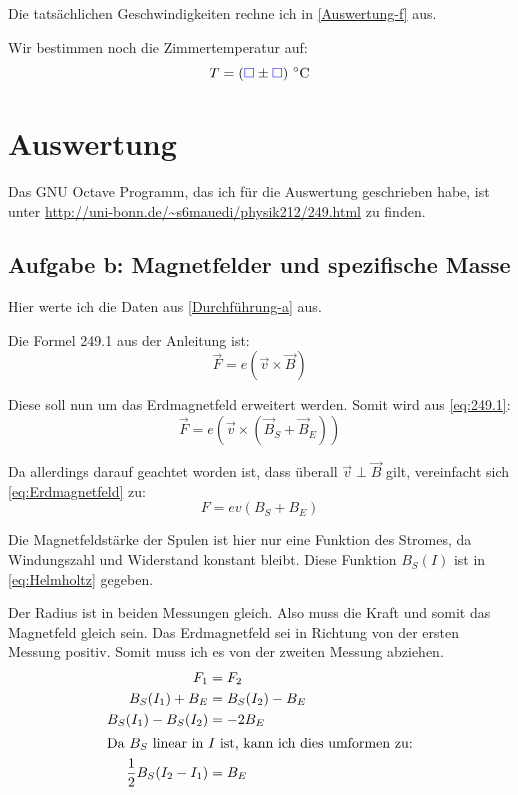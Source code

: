 \documentclass[11pt, ngerman]{article}
\newcommand{\emesswert}{\left(\messwert \pm \messwert \right)}
\newcommand{\half}{\frac{1}{2}}
\newcommand{\messwert}{\textcolor{blue}{\square}}
\begin{document}
Die tatsächlichen Geschwindigkeiten rechne ich in \ref{Auswertung-f} aus.

Wir bestimmen noch die Zimmertemperatur auf:
\[ T = \unit[\emesswert]{^\circ C} \]


\section{Auswertung}

Das GNU Octave Programm, das ich für die Auswertung geschrieben habe, ist unter
\url{http://uni-bonn.de/~s6mauedi/physik212/249.html} zu finden.

\subsection{Aufgabe b: Magnetfelder und spezifische Masse}

\label{Auswertung-b}

Hier werte ich die Daten aus \ref{Durchführung-a} aus.

Die Formel 249.1 aus der Anleitung ist:
\begin{equation}
	\label{eq:249.1}
	\vec F = e \left( \vec v \times \vec B \right)
\end{equation}

Diese soll nun um das Erdmagnetfeld erweitert werden. Somit wird aus
\eqref{eq:249.1}:
\begin{equation}
	\label{eq:Erdmagnetfeld}
	\vec F = e \left( \vec v \times \left( \vec B_S + \vec B_E \right) \right)
\end{equation}

Da allerdings darauf geachtet worden ist, dass überall $\vec v \perp \vec B$
gilt, vereinfacht sich \eqref{eq:Erdmagnetfeld} zu:
\begin{equation}
	\label{eq:magnetische-Kraft}
	F = e v (B_S + B_E)
\end{equation}

Die Magnetfeldstärke der Spulen ist hier nur eine Funktion des Stromes, da
Windungszahl und Widerstand konstant bleibt. Diese Funktion $B_S(I)$ ist in
\eqref{eq:Helmholtz} gegeben.

Der Radius ist in beiden Messungen gleich. Also muss die Kraft und somit das
Magnetfeld gleich sein. Das Erdmagnetfeld sei in Richtung von der ersten
Messung positiv. Somit muss ich es von der zweiten Messung abziehen.
%
\begin{align*}
	F_1 &= F_2 \\
	B_S(I_1) + B_E &= B_S(I_2) - B_E \\
	B_S(I_1) - B_S(I_2) &= - 2 B_E \\
	\intertext{Da $B_S$ linear in $I$ ist, kann ich dies umformen zu:}
	\half B_S(I_2 - I_1) &= B_E \\
\end{align*}
\end{document}
